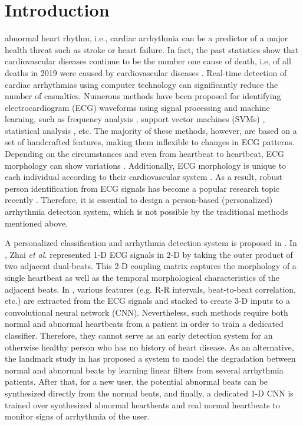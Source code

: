 \documentclass[journal,transmag]{IEEEtran}
\begin{document}
\section{Introduction}
 abnormal heart rhythm, i.e., cardiac arrhythmia can be a predictor of a major health threat such as stroke or heart failure. In fact, the past statistics show that cardiovascular diseases continue to be the number one cause of death, i.e,  of all deaths in 2019 were caused by cardiovascular diseases \cite{murray2020global}. Real-time detection of cardiac arrhythmias using computer technology can significantly reduce the number of casualties. Numerous methods have been proposed for identifying electrocardiogram (ECG) waveforms using signal processing and machine learning, such as frequency analysis \cite{frequency}, support vector machines (SVMs) \cite{SVM}, statistical analysis \cite{statistical}, etc. The majority of these methods, however, are based on a set of handcrafted features, making them inflexible to changes in ECG patterns. Depending on the circumstances and even from heartbeat to heartbeat, ECG morphology can show variations \cite{hoekema2001geometrical}. Additionally, ECG morphology is unique to each individual according to their cardiovascular system \cite{ECGDataset1}. As a result, robust person identification from ECG signals has become a popular research topic recently \cite{ECGBiometrics1, ECGBiometrics2}. Therefore, it is essential to design a person-based (personalized) arrhythmia detection system, which is not possible by the traditional methods mentioned above. 

A personalized classification and arrhythmia detection system is proposed in \cite{kiranyaz2016real, patient_spesific1, patient_spesific2}. In \cite{zhai2018automated}, Zhai \textit{et al.} represented 1-D ECG signals in 2-D by taking the outer product of two adjacent dual-beats. This 2-D coupling matrix captures the morphology of a single heartbeat as well as the temporal morphological characteristics of the adjacent beats. In \cite{li2019automated}, various features (e.g. R-R intervals, beat-to-beat correlation, etc.) are extracted from the ECG signals and stacked to create 3-D inputs to a convolutional neural network (CNN). 
Nevertheless, such methods require both normal and abnormal heartbeats from a patient in order to train a dedicated classifier. Therefore, they cannot serve as an early detection system for an otherwise healthy person who has no history of heart disease. As an alternative, the landmark study in \cite{kiranyaz2017personalized} has proposed a system to model the degradation between normal and abnormal beats by learning linear filters from several arrhythmia patients. After that, for a new user, the potential abnormal beats can be synthesized directly from the normal beats, and finally, a dedicated 1-D CNN is trained over synthesized abnormal heartbeats and real normal heartbeats to monitor signs of arrhythmia of the user.
\end{document}
